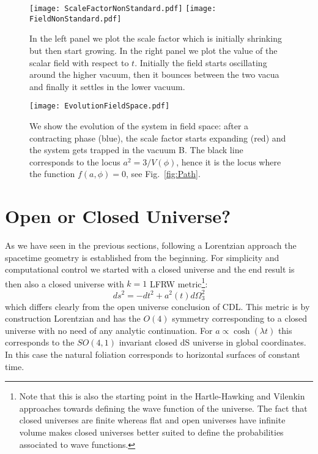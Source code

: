 \documentclass[a4paper,11pt]{article}
\numberwithin{equation}{section}
\begin{document}
\begin{itemize}
\begin{figure}[h!] 
\begin{center} 
\texttt{[image: ScaleFactorNonStandard.pdf]} \qquad
\texttt{[image: FieldNonStandard.pdf]}
\caption{\footnotesize{In the left panel we plot the scale factor  which is initially shrinking but then start growing.  In the right panel we plot the value of the scalar field with respect to  $t$. Initially  the field starts oscillating around the higher vacuum, then it bounces between the two vacua and finally it settles in  the lower vacuum.} \label{fig:NonStandardFieldEvolution}}
\end{center} 
\end{figure}

\begin{figure}[h!] 
\begin{center} 
\texttt{[image: EvolutionFieldSpace.pdf]}
\caption{\footnotesize{We show the evolution of the system in field space: after a contracting phase (blue), the scale factor starts expanding (red) and the system gets trapped in the vacuum B. The black line corresponds to the locus $a^2 = 3/V(\phi)$, hence it is the locus where the function $f(a,\phi) = 0$, see Fig.~\ref{fig:Path}.} \label{fig:EvolutionFieldSpace}}
\end{center} 
\end{figure}
\end{itemize}



\section{Open or Closed Universe?}
\label{sec:OpenClosed}

As we have seen in the previous sections, following  a Lorentzian approach the spacetime geometry is established from the beginning. For simplicity and computational control we started with a closed universe and the end result is then also a closed universe with $k=1$ LFRW  metric\footnote{Note that this is also the starting point in the Hartle-Hawking and Vilenkin approaches towards defining the wave function of the universe. The fact that closed universes are finite whereas flat and open universes have infinite volume makes closed universes better suited to define the probabilities associated to wave functions.}:
\begin{equation}
ds^2= -dt^2+a^2(t) d\Omega_3^2
\end{equation} 
which differs clearly from the open universe conclusion of CDL. This metric is by construction Lorentzian and has the $O(4)$ symmetry corresponding to a closed universe with no need of any analytic continuation.
 For $a\propto \cosh(\lambda t)$ this corresponds to the $SO(4,1)$ invariant closed  dS universe in global coordinates. In this case the natural foliation corresponds to horizontal surfaces of constant time. 
 
\end{document}
